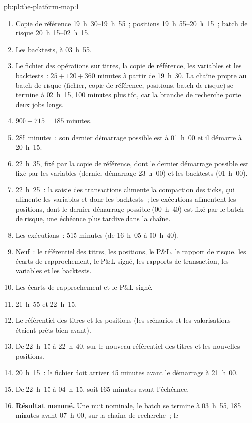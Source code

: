 \begin{solution}{pb:pl:the-platform-map:1}
\begin{enumerate}
\item Copie de référence 19~h~30--19~h~55~; positions 19~h~55--20~h~15~; batch de risque 20~h~15--02~h~15.
\item Les backtests, à 03~h~55.
\item Le fichier des opérations sur titres, la copie de référence, les variables et les backtests~: $25 + 120 + 360$ minutes à partir de 19~h~30. La chaîne propre au
batch de risque (fichier, copie de référence, positions, batch de risque) se termine à 02~h~15, 100 minutes plus tôt, car la branche de recherche
porte deux jobs longs.
\item $900 - 715 = 185$ minutes.
\item 285 minutes~: son dernier démarrage possible est à 01~h~00 et il démarre à 20~h~15.
\item 22~h~35, fixé par la copie de référence, dont le dernier démarrage possible est fixé par les variables (dernier démarrage 23~h~00) et les backtests (01~h~00).
\item 22~h~25~: la saisie des transactions alimente la compaction des ticks, qui alimente les variables et donc les backtests~; les exécutions alimentent les positions,
dont le dernier démarrage possible (00~h~40) est fixé par le batch de risque, une échéance plus tardive dans la chaîne.
\item Les exécutions~: 515 minutes (de 16~h~05 à 00~h~40).
\item Neuf~: le référentiel des titres, les positions, le P\&L, le rapport de risque, les écarts de rapprochement, le P\&L signé, les
rapports de transaction, les variables et les backtests.
\item Les écarts de rapprochement et le P\&L signé.
\item 21~h~55 et 22~h~15.
\item Le référentiel des titres et les positions (les scénarios et les valorisations étaient prêts bien avant).
\item De 22~h~15 à 22~h~40, sur le nouveau référentiel des titres et les nouvelles positions.
\item 20~h~15~: le fichier doit arriver 45 minutes avant le démarrage à 21~h~00.
\item De 22~h~15 à 04~h~15, soit 165 minutes avant l'échéance.
\item \textbf{Résultat nommé.} Une nuit nominale, le batch se termine à 03~h~55, 185 minutes avant 07~h~00, sur la chaîne de recherche~; le

\end{enumerate}
\end{solution}

